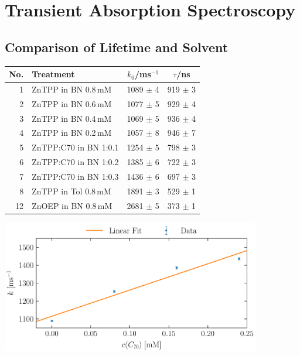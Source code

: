 \section{Transient Absorption Spectroscopy}
\label{sec:transient}

\subsection{Comparison of Lifetime and Solvent}
\label{sub:comparison}

\begin{center}
    \captionsetup{type = table}
    \begin{tabular}{r | l | c c}
        No. & Treatment             & $k_0$/ms$^{-1}$ & $\tau$/ns   \\\hline
        1   & ZnTPP in BN 0.8\,mM   & 1089 $\pm$ 4    & 919 $\pm$ 3 \\
        2   & ZnTPP in BN 0.6\,mM   & 1077 $\pm$ 5    & 929 $\pm$ 4 \\
        3   & ZnTPP in BN 0.4\,mM   & 1069 $\pm$ 5    & 936 $\pm$ 4 \\
        4   & ZnTPP in BN 0.2\,mM   & 1057 $\pm$ 8    & 946 $\pm$ 7 \\\hline
        5   & ZnTPP:C70 in BN 1:0.1 & 1254 $\pm$ 5    & 798 $\pm$ 3 \\
        6   & ZnTPP:C70 in BN 1:0.2 & 1385 $\pm$ 6    & 722 $\pm$ 3 \\
        7   & ZnTPP:C70 in BN 1:0.3 & 1436 $\pm$ 6    & 697 $\pm$ 3 \\\hline
        8   & ZnTPP in Tol 0.8\,mM  & 1891 $\pm$ 3    & 529 $\pm$ 1 \\\hline
        12  & ZnOEP in BN 0.8\,mM   & 2681 $\pm$ 5    & 373 $\pm$ 1 \\
    \end{tabular}
    \label{tab:lifetimeDecay}
\end{center}



\begin{center}
    \captionsetup{type = figure}
    \includegraphics[width = 0.85\textwidth]{Pictures/Evaluation/42/Concentration.pdf}
    \label{fig:concentration}
\end{center}

